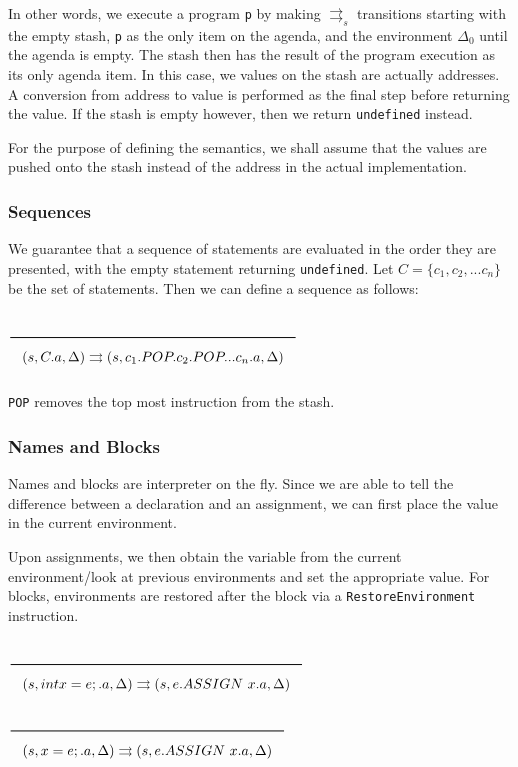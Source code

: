 \documentclass[a4paper]{article}
\newcommand{\Rule}[2]{\genfrac{}{}{0.7pt}{}{{\setlength{\fboxrule}{0pt}\setlength{\fboxsep}{3mm}\fbox{$#1$}}}{{\setlength{\fboxrule}{0pt}\setlength{\fboxsep}{3mm}\fbox{$#2$}}}}
\begin{document}
In other words, we execute a program \texttt{p} by making $\rightrightarrows_s$ transitions starting with the empty stash, \texttt{p} as the only item on the agenda, and the environment $\Delta_0$ until the agenda is empty. The stash then has the result of the program execution as its only agenda item. In this case, we values on the stash are actually addresses. A conversion from address to value is performed as the final step before returning the value. If the stash is empty however, then we return \texttt{undefined} instead.

For the purpose of defining the semantics, we shall assume that the values are pushed onto the stash instead of the address in the actual implementation. 



\subsubsection{Sequences}
We guarantee that a sequence of statements are evaluated in the order they are presented, with the empty statement returning \texttt{undefined}. Let $C = \{c_1, c_2, ... c_n\}$ be the set of statements. Then we can define a sequence as follows:

\begin{center}
$\Rule{}{(s, C . a, \Delta) \rightrightarrows (s, c_1.POP.c_2.POP...c_n.a, \Delta)}$
\end{center}

\texttt{POP} removes the top most instruction from the stash. 

\subsubsection{Names and Blocks}

Names and blocks are interpreter on the fly. Since we are able to tell the difference between a declaration and an assignment, we can first place the value in the current environment. 

Upon assignments, we then obtain the variable from the current environment/look at previous environments and set the appropriate value. For blocks, environments are restored after the block via a \texttt{RestoreEnvironment} instruction. 

\begin{center}
    $\Rule{}{(s, int x = e; . a, \Delta) \rightrightarrows (s, e.ASSIGN \ x.a, \Delta)}$
    \hfill
    $\Rule{}{(s,  x = e; . a, \Delta) \rightrightarrows (s, e.ASSIGN \ x.a, \Delta)}$
\end{center}
\end{document}
